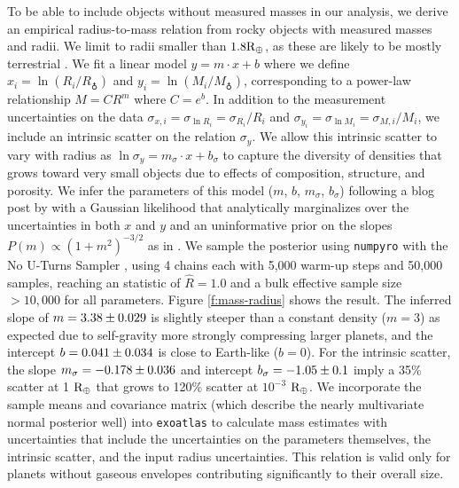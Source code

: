 \documentclass[modern,linenumbers,trackchanges]{aastex7}
\begin{document}
To be able to include objects without measured masses in our analysis, we derive an empirical radius-to-mass relation from rocky objects with measured masses and radii. We limit to radii smaller than $1.8 {\rm R_\oplus}$, as these are likely to be mostly terrestrial \citep{fultonCaliforniaKeplerSurveyVII2018, zengNewPerspectivesExoplanet2021, rogersMostSuperEarthsHave2025}. We fit a linear model $y = m\cdot x + b$ where we define $x_i = \ln (R_i/R_\earth)$ and $y_i = \ln (M_i/M_\earth)$, corresponding to a power-law relationship $M = CR^m$ where $C = e^b$. In addition to the measurement uncertainties on the data $\sigma_{x,i} = \sigma_{\ln R_i} = \sigma_{R_i}/{R_i}$ and $ \sigma_{y_i} =  \sigma_{\ln M_i} =  \sigma_{M,i}/M_i$, we include an intrinsic scatter on the relation $\sigma_{y}$. We allow this intrinsic scatter to vary with radius as $\ln \sigma_{y} = m_\sigma \cdot x + b_\sigma$ to capture the diversity of densities that grows toward very small objects due to effects of composition, structure, and porosity. We infer the parameters of this model ($m$, $b$, $m_\sigma$, $b_\sigma$) following a blog post by \citet[][see also \citealt{hoggDataAnalysisRecipes2010a}]{foreman-mackeyFittingPlaneData2017} with a Gaussian likelihood that analytically marginalizes over the uncertainties in both $x$ and $y$ and an uninformative prior on the slopes $P(m) \propto (1+m^2)^{-3/2}$ as in \citet{vanderplasFrequentismBayesianismPythondriven2014a}. We sample the posterior using \texttt{numpyro} \citep{phanComposableEffectsFlexible2019} with the No U-Turns Sampler \citep[NUTS;][]{hoffmanNoUTurnSamplerAdaptively2011}, using 4 chains each with 5,000 warm-up steps and 50,000 samples, reaching an \citet{gelmanInferenceIterativeSimulation1992} statistic of $\hat{R}=1.0$ and a bulk effective sample size $>10,000$ \citep[][see also \citealt{hoggDataAnalysisRecipes2018}]{vehtariRankNormalizationFoldingLocalization2021} for all parameters. Figure \ref{f:mass-radius} shows the result. The inferred slope of $m = 3.38 \pm 0.029 $ is slightly steeper than a constant density ($m=3$) as expected due to self-gravity more strongly compressing larger planets, and the intercept $b = 0.041 \pm 0.034$ is close to Earth-like ($b=0$). For the intrinsic scatter, the slope $m_\sigma = -0.178 \pm 0.036 $ and intercept $b_\sigma = -1.05 \pm 0.1$ imply a 35\% scatter at 1 ${\rm R_\oplus}$ that grows to 120\% scatter at $10^{-3}$ ${\rm R_\oplus}$. We incorporate the sample means and covariance matrix (which describe the nearly multivariate normal posterior well) into \texttt{exoatlas} to calculate mass estimates with uncertainties that include the uncertainties on the parameters themselves, the intrinsic scatter, and the input radius uncertainties. This relation is valid only for planets without gaseous envelopes contributing significantly to their overall size.
\end{document}
